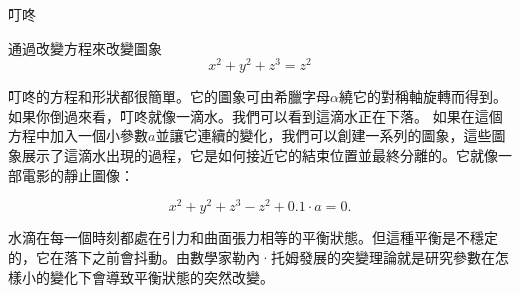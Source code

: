\begin{surferPage}{叮咚}

通過改變方程來改變圖象\\

\smallskip
\[x^2	+ y^2	+ z^3	= z^2\]

\singlespacing
叮咚的方程和形狀都很簡單。它的圖象可由希臘字母$\alpha$繞它的對稱軸旋轉而得到。如果你倒過來看，叮咚就像一滴水。我們可以看到這滴水正在下落。
\newline
如果在這個方程中加入一個小參數$a$並讓它連續的變化，我們可以創建一系列的圖象，這些圖象展示了這滴水出現的過程，它是如何接近它的結束位置並最終分離的。它就像一部電影的靜止圖像：
\smallskip

\[x^2	+ y^2	+ z^3	-z^2+0.1\cdot a=0.\]

\singlespacing
水滴在每一個時刻都處在引力和曲面張力相等的平衡狀態。但這種平衡是不穩定的，它在落下之前會抖動。由數學家勒內·托姆發展的突變理論就是研究參數在怎樣小的變化下會導致平衡狀態的突然改變。
\end{surferPage}

